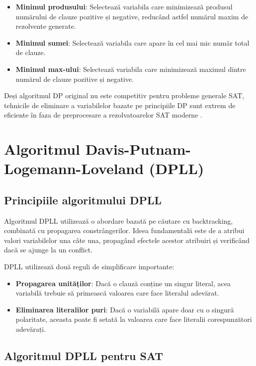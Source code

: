 \documentclass[a4paper,10pt]{article}
\begin{document}
\begin{itemize}
    \item \textbf{Minimul produsului}: Selectează variabila care minimizează produsul numărului de clauze pozitive și negative, reducând astfel numărul maxim de rezolvente generate.
    \item \textbf{Minimul sumei}: Selectează variabila care apare în cel mai mic număr total de clauze.
    \item \textbf{Minimul max-ului}: Selectează variabila care minimizează maximul dintre numărul de clauze pozitive și negative.
\end{itemize}

Deși algoritmul DP original nu este competitiv pentru probleme generale SAT, tehnicile de eliminare a variabilelor bazate pe principiile DP sunt extrem de eficiente în faza de preprocesare a rezolvatoarelor SAT moderne \cite{Een2019}.

\section{Algoritmul Davis-Putnam-Logemann-Loveland (DPLL)}

\subsection{Principiile algoritmului DPLL}

Algoritmul DPLL \cite{DavisPutnamLovemanLoveland1962} utilizează o abordare bazată pe căutare cu backtracking, combinată cu propagarea constrângerilor. Ideea fundamentală este de a atribui valori variabilelor una câte una, propagând efectele acestor atribuiri și verificând dacă se ajunge la un conflict.

DPLL utilizează două reguli de simplificare importante:
\begin{itemize}
    \item \textbf{Propagarea unităților}: Dacă o clauză conține un singur literal, acea variabilă trebuie să primească valoarea care face literalul adevărat.
    \item \textbf{Eliminarea literalilor puri}: Dacă o variabilă apare doar cu o singură polaritate, aceasta poate fi setată la valoarea care face literalii corespunzători adevărați.
\end{itemize}

\subsection{Algoritmul DPLL pentru SAT}
\end{document}
